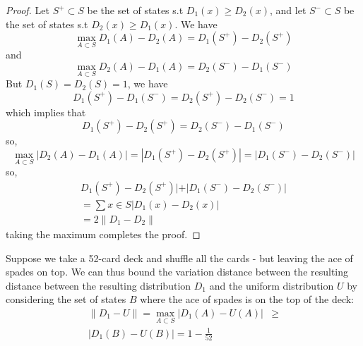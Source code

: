 \documentclass[11pt]{article}
\newcommand{\norm}[1]{\left\lVert#1\right\rVert}
\begin{document}
\begin{proof}
Let \(S^+ \subset S\) be the set of states s.t \(D_1\left(x\right) \geq D_2\left(x\right)\), and let \(S^- \subset S\) be the set of states s.t \(D_2\left(x\right) \geq D_1\left(x\right)\). We have
\begin{equation}
\underset{A \subset S}{\operatorname{max}} D_1\left(A\right) - D_2\left(A\right) = D_1\left(S^+\right) - D_2\left(S^+\right)
\end{equation}
and
\begin{equation}
\underset{A \subset S}{\operatorname{max}} D_2\left(A\right) - D_1\left(A\right) = D_2\left(S^-\right) - D_1\left(S^-\right)
\end{equation}
But \(D_1\left(S\right) = D_2\left(S\right) = 1\), we have
\begin{equation}
D_1\left(S^+\right) - D_1\left(S^-\right) = D_2\left(S^+\right) - D_2\left(S^-\right) = 1
\end{equation}
which implies that
\begin{equation}
D_1\left(S^+\right) - D_2\left(S^+\right) = D_2\left(S^-\right) - D_1\left(S^-\right)
\end{equation}
so, 
\begin{equation}
\underset{A \subset S}{\operatorname{max}} |D_2\left(A\right) - D_1\left(A\right)| = |D_1\left(S^+\right) - D_2\left(S^+\right)| = |D_1\left(S^-\right) - D_2\left(S^-\right)|
\end{equation}
so,
\begin{align}
D_1\left(S^+\right) - D_2\left(S^+\right)| + |D_1\left(S^-\right) - D_2\left(S^-\right)| \\ = \sum{x \in S} |D_1\left(x\right) - D_2\left(x\right)| \\ = 2\norm{D_1 - D_2}
\end{align}
taking the maximum completes the proof.
\end{proof}
Suppose we take a 52-card deck and shuffle all the cards - but leaving the ace of spades on top. We can thus bound the variation distance between the resulting distance between the resulting distribution \(D_1\) and the uniform distribution \(U\) by considering the set of states \(B\) where the ace of spades is on the top of the deck:
\begin{align}
\norm{D_1 - U} = \underset{A \subset S}{\operatorname{max}} |D_1\left(A\right) - U\left(A\right)| &\geq \\
|D_1\left(B\right) - U\left(B\right)| = 1 - \frac{1}{52}
\end{align}
\end{document}
